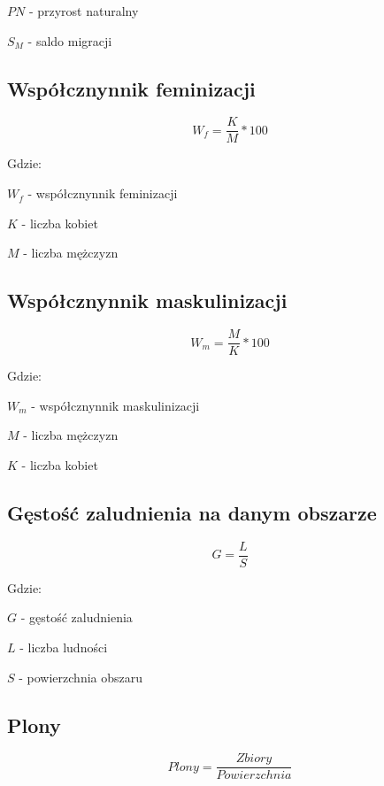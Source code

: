 \documentclass[a4paper,10pt]{article}
\begin{document}
  $ PN $ - przyrost naturalny
  
  $ S_{M} $ - saldo migracji
  
  \subsection{Współcznynnik feminizacji}
  
  \begin{equation}
   W_{f} = \frac{K}{M} * 100
  \end{equation}
  
  Gdzie:
  
  $ W_{f} $ - współcznynnik feminizacji
  
  $ K $ - liczba kobiet
  
  $ M $ - liczba mężczyzn

  
  \subsection{Współcznynnik maskulinizacji}
  
  \begin{equation}
   W_{m} = \frac{M}{K} * 100
  \end{equation}

  Gdzie:
  
  $ W_{m} $ - współcznynnik maskulinizacji
  
  $ M $ - liczba mężczyzn
  
  $ K $ - liczba kobiet
  
  
  \subsection{Gęstość zaludnienia na danym obszarze}
  
  \begin{equation}
   G = \frac{L}{S}
  \end{equation}
  
  Gdzie:
  
  $ G $ - gęstość zaludnienia
  
  $ L $ - liczba ludności
  
  $ S $ - powierzchnia obszaru
  
  \subsection{Plony}
  
  \begin{equation}
   Plony = \frac{Zbiory}{Powierzchnia}
  \end{equation}
\end{document}
